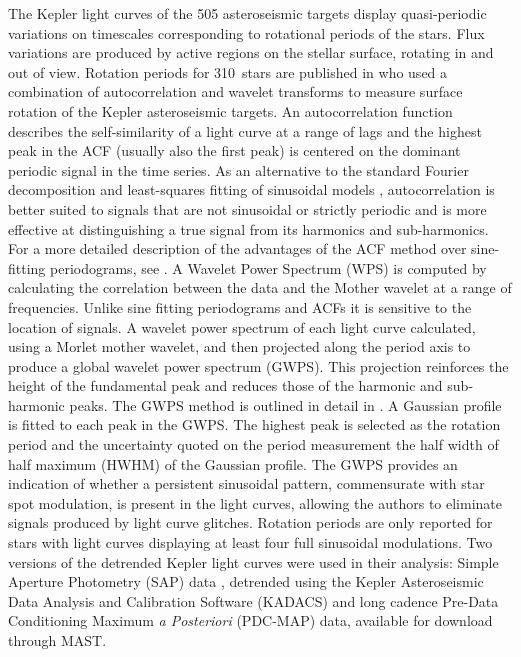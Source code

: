\documentclass[10pt,preprint]{aastex}
\newcommand{\ngarcia}{310~}
\begin{document}
The Kepler light curves of the 505 asteroseismic targets display quasi-periodic variations on timescales corresponding to rotational periods of the stars.
Flux variations are produced by active regions on the stellar surface, rotating in and out of view.
Rotation periods for \ngarcia stars are published in \citet{Garcia2014} who used a combination of autocorrelation and wavelet transforms to measure surface rotation of the Kepler asteroseismic targets.
An autocorrelation function describes the self-similarity of a light curve at a range of lags and the highest peak in the ACF (usually also the first peak) is centered on the dominant periodic signal in the time series.
As an alternative to the standard Fourier decomposition and least-squares fitting of sinusoidal models \citep{Zechmeister}, autocorrelation is better suited to signals that are not sinusoidal or strictly periodic and is more effective at distinguishing a true signal from its harmonics and sub-harmonics.
For a more detailed description of the advantages of the ACF method over sine-fitting periodograms, see \citet{McQuillan}.
A Wavelet Power Spectrum (WPS) is computed by calculating the correlation between the data and the Mother wavelet at a range of frequencies.
Unlike sine fitting periodograms and ACFs it is sensitive to the location of signals.
A wavelet power spectrum of each light curve calculated, using a Morlet mother wavelet, and then projected along the period axis to produce a global wavelet power spectrum (GWPS).
This projection reinforces the height of the fundamental peak and reduces those of the harmonic and sub-harmonic peaks.
The GWPS method is outlined in detail in \citep{Mathur2014}.
A Gaussian profile is fitted to each peak in the GWPS.
The highest peak is selected as the rotation period and the uncertainty quoted on the period measurement the half width of half maximum (HWHM) of the Gaussian profile.
The GWPS provides an indication of whether a persistent sinusoidal pattern, commensurate with star spot modulation, is present in the light curves, allowing the authors to eliminate signals produced by light curve glitches.
Rotation periods are only reported for stars with light curves displaying at least four full sinusoidal modulations.
Two versions of the detrended Kepler light curves were used in their analysis: Simple Aperture Photometry (SAP) data \citep{Thompson2013}, detrended using the Kepler Asteroseismic Data Analysis and Calibration Software (KADACS) \citep{Garcia2011} and long cadence Pre-Data Conditioning Maximum \emph{a Posteriori} (PDC-MAP) data, available for download through MAST.
\end{document}
